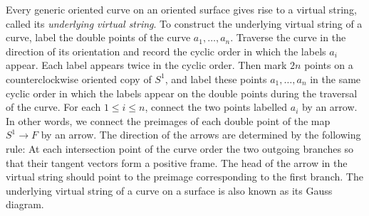 Every generic oriented curve on an oriented surface gives rise to a virtual string, called its {\it underlying virtual string}.  To construct the underlying virtual string of a curve, label the double points of the curve $a_1, \dots, a_n$.  Traverse the curve in the direction of its orientation and record the cyclic order in which the labels $a_i$ appear.  Each label appears twice in the cyclic order.  Then mark $2n$ points on a counterclockwise oriented copy of $S^1$, and label these points $a_1, \dots, a_n$ in the same cyclic order in which the labels appear on the double points during the traversal of the curve. For each $1\leq i \leq n$, connect the two points labelled $a_i$ by an arrow.  In other words, we connect the preimages of each double point of the map $S^1\rightarrow F$ by an arrow.  The direction of the arrows are determined by the following rule: At each intersection point of the curve order the two outgoing branches so that their tangent vectors form a positive frame.  The head of the arrow in the virtual string should point to the preimage corresponding to the first branch.  The underlying virtual string of a curve on a surface is also known as its Gauss diagram.

